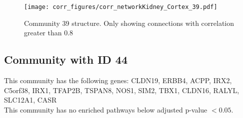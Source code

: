 \begin{figure}[h!]
\centering
\texttt{[image: corr\_figures/corr\_networkKidney\_Cortex\_39.pdf]}
\caption{Community 39 structure. Only showing connections with correlation greater than 0.8}
\end{figure}




\subsection*{Community with ID 44}
This community has the following genes: CLDN19, ERBB4, ACPP, IRX2, C5orf38, IRX1, TFAP2B, TSPAN8, NOS1, SIM2, TBX1, CLDN16, RALYL, SLC12A1, CASR
\\
This community has no enriched pathways below adjusted p-value $< 0.05$.

